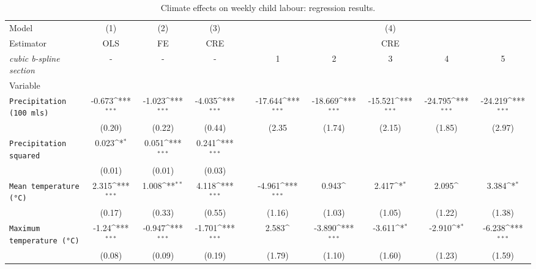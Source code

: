 \documentclass[a4paper,12pt]{article}
\def\sym#1{\ifmmode^{#1}\else\(^{#1}\)\fi}
\theoremstyle{plain}
\theoremstyle{definition}
\theoremstyle{definition}
\theoremstyle{definition}
\theoremstyle{definition}
\begin{document}
\begin{landscape}
\begin{table}[htbp]
\begin{center}
    \caption{Climate effects on weekly child labour: regression results.}
    \label{tab:results}

\begin{tabular}{l*{9}{c}}
    \hline\hline
Model &\multicolumn{1}{c}{(1)}&\multicolumn{1}{c}{(2)}&\multicolumn{1}{c}{(3)}& &\multicolumn{1}{c}{}&\multicolumn{1}{c}{}&\multicolumn{1}{c}{(4)}&\multicolumn{1}{c}{}&\multicolumn{1}{c}{}\\
Estimator &\multicolumn{1}{c}{OLS}&\multicolumn{1}{c}{FE}&\multicolumn{1}{c}{CRE}&& & &\multicolumn{1}{c}{CRE}& &\\
\cline{2-4}    \cline{6-10}
    \textit{cubic b-spline section} &-&-&-& &\multicolumn{1}{c}{1}&\multicolumn{1}{c}{2}&\multicolumn{1}{c}{3}&\multicolumn{1}{c}{4}&\multicolumn{1}{c}{5} \\
    [1em]
    Variable\\
    \hline
    \texttt{Precipitation (100 mls)}
    & -0.673\sym{***} & -1.023\sym{***} & -4.035\sym{***}&
    & -17.644\sym{***} & -18.669\sym{***} & -15.521\sym{***} & -24.795\sym{***} & -24.219\sym{***}\\
    &     (0.20)      &     (0.22)      &     (0.44)     &
    &     (2.35      &     (1.74)      &     (2.15)     &     (1.85)       &     (2.97)     \\
    [1em]
    \texttt{Precipitation squared}
    &  0.023\sym{*}   &  0.051\sym{***} & 0.241\sym{***} & & & & & & \\
    &     (0.01)      &     (0.01)      &       (0.03)   & & & & & & \\
    [1em]
    \texttt{Mean temperature (°C)}
    &  2.315\sym{***} &  1.008\sym{**}  & 4.118\sym{***} &
    & -4.961\sym{***} &  0.943\sym{}    & 2.417\sym{*}   & 2.095\sym{}      & 3.384\sym{*}   \\
    &     (0.17)      &     (0.33)      &     (0.55)     &
    &     (1.16)      &     (1.03)      &     (1.05)     &     (1.22)       &     (1.38)     \\
    [1em]
    \texttt{Maximum temperature (°C)}
    &  -1.24\sym{***} & -0.947\sym{***} & -1.701\sym{***}&
    &   2.583\sym{}   & -3.890\sym{***} & -3.611\sym{*}  & -2.910\sym{*}    & -6.238\sym{***}\\
    &     (0.08)      &     (0.09)      &     (0.19)     &
    &     (1.79)      &     (1.10)      &     (1.60)     &     (1.23)       &     (1.59)     \\

\end{tabular}
\end{center}
\end{table}
\end{landscape}
\end{document}
